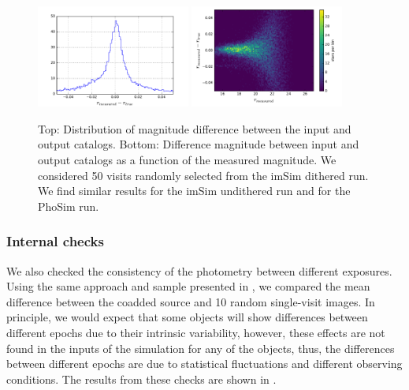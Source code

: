 \documentclass[twocolumn]{aastex62}
\begin{document}
\begin{figure}
  \centering
  \includegraphics[width=0.45\textwidth]{photometry_imsim_dithered_50visits_hist}
  \includegraphics[width=0.45\textwidth]{photometry_imsim_dithered_50visits}
  \caption{Top: Distribution of magnitude difference between the input and output catalogs.
  Bottom: Difference magnitude between input and output catalogs as a function of the measured magnitude. We considered 50 visits
  randomly selected from the imSim dithered run. We find similar results for the imSim undithered run and for the PhoSim run.}
  \label{fig:photometry_a}
\end{figure}

\subsubsection{Internal checks}
\label{sec:internal_photometry}

We also checked the consistency of the photometry between different exposures. Using the same approach and sample presented in
, we compared the mean difference between the coadded source and 10 random single-visit images. In
principle, we would expect that some objects will show differences between different epochs due to their intrinsic variability, however,
these effects are not found in the inputs of the simulation for any of the objects, thus, the differences between different epochs are due to
statistical fluctuations and different observing conditions. The results from these checks are shown in .
\end{document}
